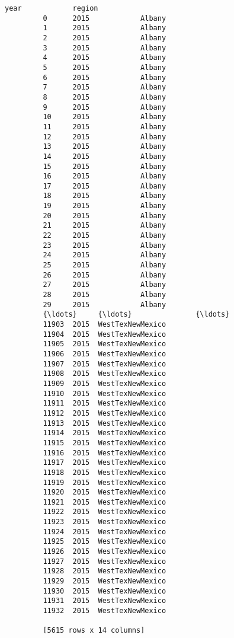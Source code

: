 \documentclass[11pt]{article}
\begin{document}
\begin{Verbatim}[commandchars=\\\{\}]
                year            region  
         0      2015            Albany  
         1      2015            Albany  
         2      2015            Albany  
         3      2015            Albany  
         4      2015            Albany  
         5      2015            Albany  
         6      2015            Albany  
         7      2015            Albany  
         8      2015            Albany  
         9      2015            Albany  
         10     2015            Albany  
         11     2015            Albany  
         12     2015            Albany  
         13     2015            Albany  
         14     2015            Albany  
         15     2015            Albany  
         16     2015            Albany  
         17     2015            Albany  
         18     2015            Albany  
         19     2015            Albany  
         20     2015            Albany  
         21     2015            Albany  
         22     2015            Albany  
         23     2015            Albany  
         24     2015            Albany  
         25     2015            Albany  
         26     2015            Albany  
         27     2015            Albany  
         28     2015            Albany  
         29     2015            Albany  
         {\ldots}     {\ldots}               {\ldots}  
         11903  2015  WestTexNewMexico  
         11904  2015  WestTexNewMexico  
         11905  2015  WestTexNewMexico  
         11906  2015  WestTexNewMexico  
         11907  2015  WestTexNewMexico  
         11908  2015  WestTexNewMexico  
         11909  2015  WestTexNewMexico  
         11910  2015  WestTexNewMexico  
         11911  2015  WestTexNewMexico  
         11912  2015  WestTexNewMexico  
         11913  2015  WestTexNewMexico  
         11914  2015  WestTexNewMexico  
         11915  2015  WestTexNewMexico  
         11916  2015  WestTexNewMexico  
         11917  2015  WestTexNewMexico  
         11918  2015  WestTexNewMexico  
         11919  2015  WestTexNewMexico  
         11920  2015  WestTexNewMexico  
         11921  2015  WestTexNewMexico  
         11922  2015  WestTexNewMexico  
         11923  2015  WestTexNewMexico  
         11924  2015  WestTexNewMexico  
         11925  2015  WestTexNewMexico  
         11926  2015  WestTexNewMexico  
         11927  2015  WestTexNewMexico  
         11928  2015  WestTexNewMexico  
         11929  2015  WestTexNewMexico  
         11930  2015  WestTexNewMexico  
         11931  2015  WestTexNewMexico  
         11932  2015  WestTexNewMexico  
         
         [5615 rows x 14 columns]
\end{Verbatim}
            
\end{document}
